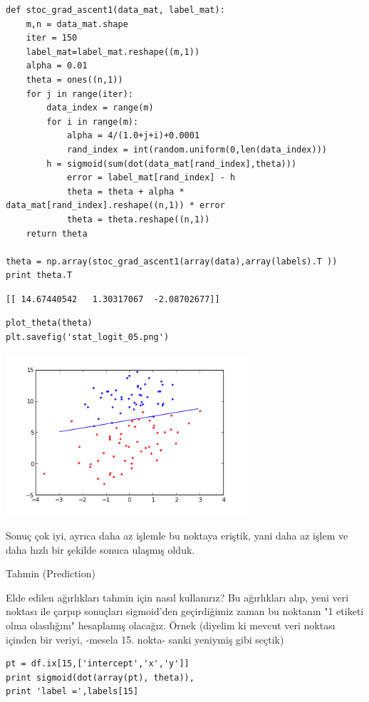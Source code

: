 \documentclass[12pt,fleqn]{article}\usepackage{../../common}
\begin{document}
\begin{verbatim}
def stoc_grad_ascent1(data_mat, label_mat):
    m,n = data_mat.shape
    iter = 150
    label_mat=label_mat.reshape((m,1))
    alpha = 0.01
    theta = ones((n,1))
    for j in range(iter):
        data_index = range(m)
        for i in range(m):
            alpha = 4/(1.0+j+i)+0.0001  
            rand_index = int(random.uniform(0,len(data_index)))
	    h = sigmoid(sum(dot(data_mat[rand_index],theta)))
            error = label_mat[rand_index] - h
            theta = theta + alpha * data_mat[rand_index].reshape((n,1)) * error
            theta = theta.reshape((n,1))
    return theta

theta = np.array(stoc_grad_ascent1(array(data),array(labels).T ))
print theta.T
\end{verbatim}

\begin{verbatim}
[[ 14.67440542   1.30317067  -2.08702677]]
\end{verbatim}

\begin{verbatim}
plot_theta(theta)
plt.savefig('stat_logit_05.png')
\end{verbatim}

\includegraphics[height=6cm]{stat_logit_05.png}

Sonuç çok iyi, ayrıca daha az işlemle bu noktaya eriştik, yani daha az işlem ve
daha hızlı bir şekilde sonuca ulaşmış olduk.

Tahmin (Prediction)

Elde edilen ağırlıkları tahmin için nasıl kullanırız? Bu ağırlıkları alıp, yeni
veri noktası ile çarpıp sonuçları sigmoid'den geçirdiğimiz zaman bu noktanın "1
etiketi olma olasılığını" hesaplamış olacağız. Örnek (diyelim ki mevcut veri
noktası içinden bir veriyi, -mesela 15. nokta- sanki yeniymiş gibi seçtik)

\begin{verbatim}
pt = df.ix[15,['intercept','x','y']]
print sigmoid(dot(array(pt), theta)), 
print 'label =',labels[15]
\end{verbatim}
\end{document}
